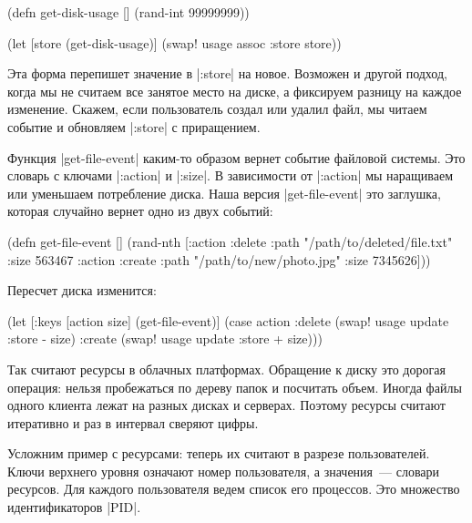 \begin{english}
  \begin{clojure}
(defn get-disk-usage []
  (rand-int 99999999))

(let [store (get-disk-usage)]
  (swap! usage assoc :store store))
  \end{clojure}
\end{english}

Эта форма перепишет значение в \spverb|:store| на новое. Возможен и другой
подход, когда мы не считаем все занятое место на диске, а фиксируем разницу на
каждое изменение. Скажем, если пользователь создал или удалил файл, мы читаем
событие и обновляем \spverb|:store| с приращением.

Функция \spverb|get-file-event| каким-то образом вернет событие файловой
системы. Это словарь с ключами \spverb|:action| и \spverb|:size|. В зависимости
от \spverb|:action| мы наращиваем или уменьшаем потребление диска. Наша версия
\spverb|get-file-event| это заглушка, которая случайно вернет одно из двух
событий:

\begin{english}
  \begin{clojure}
(defn get-file-event []
  (rand-nth
   [{:action :delete
     :path "/path/to/deleted/file.txt"
     :size 563467}
    {:action :create
     :path "/path/to/new/photo.jpg"
     :size 7345626}]))
  \end{clojure}
\end{english}

\noindent
Пересчет диска изменится:

\begin{english}
  \begin{clojure}
(let [{:keys [action size]} (get-file-event)]
  (case action
    :delete
    (swap! usage update :store - size)
    :create
    (swap! usage update :store + size)))
  \end{clojure}
\end{english}

Так считают ресурсы в облачных платформах. Обращение к диску это дорогая
операция: нельзя пробежаться по дереву папок и посчитать объем. Иногда файлы
одного клиента лежат на разных дисках и серверах. Поэтому ресурсы считают
итеративно и раз в интервал сверяют цифры.

Усложним пример с ресурсами: теперь их считают в разрезе пользователей. Ключи
верхнего уровня означают номер пользователя, а значения~--- словари
ресурсов. Для каждого пользователя ведем список его процессов. Это множество
идентификаторов \spverb|PID|.

